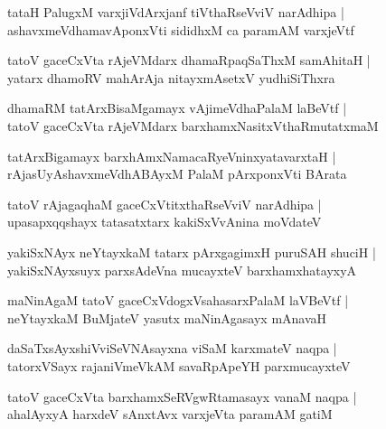 \documentclass[twoside,12pt,openright]{book}
\newcounter{shloka}[chapter]
\begin{document}
\begin{shloka}
tataH PalugxM varxjiVdArxjanf tiVthaRseVviV narAdhipa |\\
ashavxmeVdhamavAponxVti sididhxM ca paramAM varxjeVtf 
\end{shloka}

\begin{shloka}
tatoV gaceCxVta rAjeVMdarx dhamaRpaqSaThxM samAhitaH |\\
yatarx dhamoRV mahArAja nitayxmAsetxV yudhiSiThxra 
\end{shloka}

\begin{shloka}
dhamaRM tatArxBisaMgamayx vAjimeVdhaPalaM laBeVtf |\\
tatoV gaceCxVta rAjeVMdarx barxhamxNasitxVthaRmutatxmaM 
\end{shloka}

\begin{shloka}
tatArxBigamayx barxhAmxNamacaRyeVninxyatavarxtaH |\\
rAjasUyAshavxmeVdhABAyxM PalaM pArxponxVti BArata
\end{shloka}

\begin{shloka}
tatoV rAjagaqhaM gaceCxVtitxthaRseVviV narAdhipa |\\
upasapxqqshayx tatasatxtarx kakiSxVvAnina moVdateV 
\end{shloka}

\begin{shloka}
yakiSxNAyx neYtayxkaM tatarx pArxgagimxH puruSAH shuciH |\\
yakiSxNAyxsuyx parxsAdeVna mucayxteV barxhamxhatayxyA
\end{shloka}

\begin{shloka}
maNinAgaM tatoV gaceCxVdogxVsahasarxPalaM laVBeVtf |\\
neYtayxkaM BuMjateV yasutx maNinAgasayx mAnavaH 
\end{shloka}

\begin{shloka}
daSaTxsAyxshiVviSeVNAsayxna viSaM karxmateV naqpa |\\
tatorxVSayx rajaniVmeVkAM savaRpApeYH parxmucayxteV 
\end{shloka}

\begin{shloka}
tatoV gaceCxVta barxhamxSeRVgwRtamasayx vanaM naqpa |\\
ahalAyxyA harxdeV sAnxtAvx varxjeVta paramAM gatiM 
\end{shloka}
\end{document}
